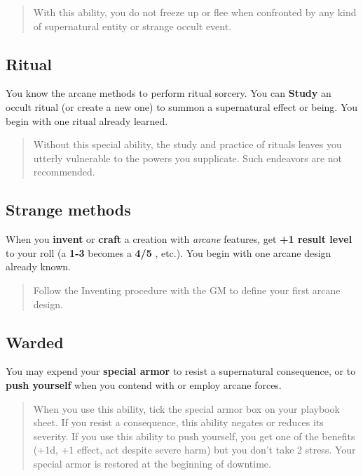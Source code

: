 \documentclass[11pt,fleqn,a5paper]{book}
\newcommand{\gameterm}[1]{\textbf{#1}}
\begin{document}
\begin{quote}
	With this ability, you do not freeze up or flee when confronted by any kind of supernatural entity or strange occult event.
\end{quote} 

\subsection{Ritual}

You know the arcane methods to perform ritual sorcery. You can \gameterm{Study}  an occult ritual (or create a new one) to summon a supernatural effect or being. You begin with one ritual already learned.

\begin{quote}
	Without this special ability, the study and practice of rituals leaves you utterly vulnerable to the powers you supplicate. Such endeavors are not recommended.
\end{quote} 

\subsection{Strange methods}

When you \textbf{invent} or \textbf{craft} a creation with \emph{arcane} features, get \textbf{+1 result level} to your roll (a \gameterm{1-3}  becomes a \gameterm{4/5} , etc.). You begin with one arcane design already known.

\begin{quote}
	Follow the Inventing procedure with the GM  to define your first arcane design.
\end{quote} 

\subsection{Warded}

You may expend your \textbf{special armor} to resist a supernatural consequence, or to \textbf{push yourself} when you contend with or employ arcane forces.

\begin{quote}
	When you use this ability, tick the special armor box on your playbook sheet. If you resist a consequence, this ability negates or reduces its severity. If you use this ability to push yourself, you get one of the benefits (+1d, +1 effect, act despite severe harm) but you don’t take 2 stress. Your special armor is restored at the beginning of downtime.
\end{quote} 
\end{document}
